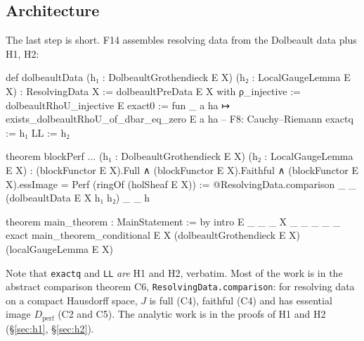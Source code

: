 \documentclass[11pt,a4paper]{article}
\newcommand{\code}[1]{\texttt{#1}}
\newcommand{\Dperf}{D_{\mathrm{perf}}}
\begin{document}
\subsection{Architecture}
\begin{center}
\end{center}
The last step is short. F14 assembles resolving data from the Dolbeault data plus H1, H2:
\begin{lean}
def dolbeaultData (h₁ : DolbeaultGrothendieck E X) (h₂ : LocalGaugeLemma E X) : ResolvingData X :=
  { dolbeaultPreData E X with
    ρ_injective := dolbeaultRhoU_injective E
    exact0 := fun _ a ha ↦ exists_dolbeaultRhoU_of_dbar_eq_zero E a ha   -- F8: Cauchy–Riemann
    exactq := h₁
    LL := h₂ }

theorem blockPerf ... (h₁ : DolbeaultGrothendieck E X) (h₂ : LocalGaugeLemma E X) :
    (blockFunctor E X).Full ∧ (blockFunctor E X).Faithful ∧
      (blockFunctor E X).essImage = Perf (ringOf (holSheaf E X)) :=
  @ResolvingData.comparison _ _ (dolbeaultData E X h₁ h₂) _ _ h

theorem main_theorem : MainStatement := by
  intro E _ _ _ X _ _ _ _ _
  exact main_theorem_conditional E X (dolbeaultGrothendieck E X) (localGaugeLemma E X)
\end{lean}
Note that \code{exactq} and \code{LL} \emph{are} H1 and H2, verbatim. Most of the work is in the
abstract comparison theorem C6, \code{ResolvingData.comparison}: for resolving data on a compact
Hausdorff space, $J$ is full (C4), faithful (C4) and has essential image $\Dperf$ (C2 and C5). The
analytic work is in the proofs of H1 and H2 (\S\ref{sec:h1}, \S\ref{sec:h2}).
\end{document}
